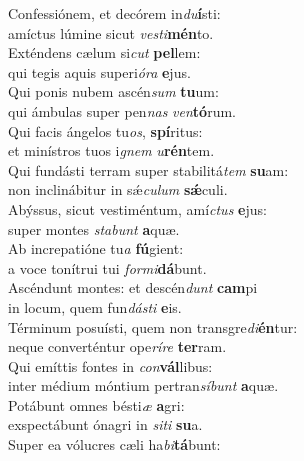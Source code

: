 \evenverse Confessiónem, et decórem in\textit{du}\textbf{í}sti:~\*\\
\evenverse amíctus lúmine sicut \textit{ve}\textit{sti}\textbf{mén}to.\\
\oddverse Exténdens cælum si\textit{cut} \textbf{pel}lem:~\*\\
\oddverse qui tegis aquis superi\textit{ó}\textit{ra} \textbf{e}jus.\\
\evenverse Qui ponis nubem ascén\textit{sum} \textbf{tu}um:~\*\\
\evenverse qui ámbulas super pen\textit{nas} \textit{ven}\textbf{tó}rum.\\
\oddverse Qui facis ángelos tu\textit{os}, \textbf{spí}ritus:~\*\\
\oddverse et minístros tuos i\textit{gnem} \textit{u}\textbf{rén}tem.\\
\evenverse Qui fundásti terram super stabilitá\textit{tem} \textbf{su}am:~\*\\
\evenverse non inclinábitur in sǽ\textit{cu}\textit{lum} \textbf{sǽ}culi.\\
\oddverse Abýssus, sicut vestiméntum, amí\textit{ctus} \textbf{e}jus:~\*\\
\oddverse super montes \textit{sta}\textit{bunt} \textbf{a}quæ.\\
\evenverse Ab increpatióne tu\textit{a} \textbf{fú}gient:~\*\\
\evenverse a voce tonítrui tui \textit{for}\textit{mi}\textbf{dá}bunt.\\
\oddverse Ascéndunt montes: et descén\textit{dunt} \textbf{cam}pi~\*\\
\oddverse in locum, quem fun\textit{dá}\textit{sti} \textbf{e}is.\\
\evenverse Términum posuísti, quem non transgre\textit{di}\textbf{én}tur:~\*\\
\evenverse neque converténtur ope\textit{rí}\textit{re} \textbf{ter}ram.\\
\oddverse Qui emíttis fontes in \textit{con}\textbf{vál}libus:~\*\\
\oddverse inter médium móntium pertran\textit{sí}\textit{bunt} \textbf{a}quæ.\\
\evenverse Potábunt omnes bésti\textit{æ} \textbf{a}gri:~\*\\
\evenverse exspectábunt ónagri in \textit{si}\textit{ti} \textbf{su}a.\\
\oddverse Super ea vólucres cæli ha\textit{bi}\textbf{tá}bunt:~\*\\
